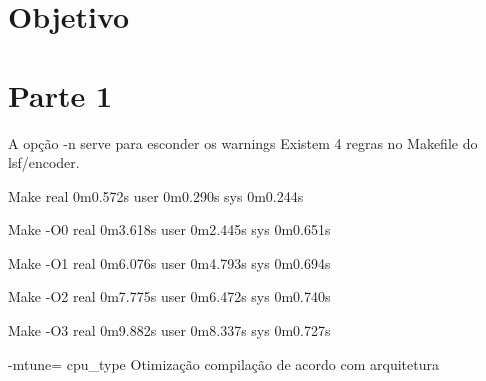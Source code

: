 \documentclass[11pt,a4paper]{article}
\begin{document}
\setlength{\parskip}{0pt}
\setlength{\parsep}{0pt}
\setlength{\headsep}{0pt}
\setlength{\topskip}{0pt}
\setlength{\topmargin}{0pt}
\setlength{\topsep}{0pt}
\setlength{\partopsep}{0pt}


\begin{minipage}{5cm}
  \vspace{2mm}
\end{minipage}

\vspace{-3mm}

\section{Objetivo}

\section{Parte 1}
A opção -n serve para esconder os warnings
Existem 4 regras no Makefile do lsf/encoder.

Make
real	0m0.572s
user	0m0.290s
sys	0m0.244s

Make -O0
real	0m3.618s
user	0m2.445s
sys	0m0.651s

Make -O1
real	0m6.076s
user	0m4.793s
sys	0m0.694s

Make -O2
real	0m7.775s
user	0m6.472s
sys	0m0.740s

Make -O3
real	0m9.882s
user	0m8.337s
sys	0m0.727s

-mtune= cpu_type 
Otimização compilação de acordo com arquitetura
\end{document}
